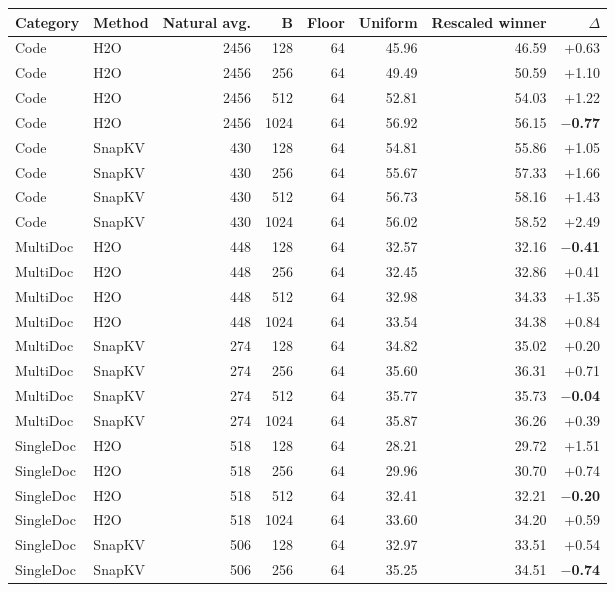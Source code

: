 \begin{table}[t]
  \centering
  \scriptsize
  \setlength{\tabcolsep}{3pt}
  \begin{tabular}{@{}l l r r r r r r@{}}
    \toprule
    Category & Method & Natural avg. & B & Floor & Uniform & Rescaled winner & $\Delta$ \\
    \midrule
    Code & H2O & 2456 & 128 & 64 & 45.96 & 46.59 & +0.63 \\
    Code & H2O & 2456 & 256 & 64 & 49.49 & 50.59 & +1.10 \\
    Code & H2O & 2456 & 512 & 64 & 52.81 & 54.03 & +1.22 \\
    Code & H2O & 2456 & 1024 & 64 & 56.92 & 56.15 & \textbf{$-$0.77} \\
    Code & SnapKV & 430 & 128 & 64 & 54.81 & 55.86 & +1.05 \\
    Code & SnapKV & 430 & 256 & 64 & 55.67 & 57.33 & +1.66 \\
    Code & SnapKV & 430 & 512 & 64 & 56.73 & 58.16 & +1.43 \\
    Code & SnapKV & 430 & 1024 & 64 & 56.02 & 58.52 & +2.49 \\
    MultiDoc & H2O & 448 & 128 & 64 & 32.57 & 32.16 & \textbf{$-$0.41} \\
    MultiDoc & H2O & 448 & 256 & 64 & 32.45 & 32.86 & +0.41 \\
    MultiDoc & H2O & 448 & 512 & 64 & 32.98 & 34.33 & +1.35 \\
    MultiDoc & H2O & 448 & 1024 & 64 & 33.54 & 34.38 & +0.84 \\
    MultiDoc & SnapKV & 274 & 128 & 64 & 34.82 & 35.02 & +0.20 \\
    MultiDoc & SnapKV & 274 & 256 & 64 & 35.60 & 36.31 & +0.71 \\
    MultiDoc & SnapKV & 274 & 512 & 64 & 35.77 & 35.73 & \textbf{$-$0.04} \\
    MultiDoc & SnapKV & 274 & 1024 & 64 & 35.87 & 36.26 & +0.39 \\
    SingleDoc & H2O & 518 & 128 & 64 & 28.21 & 29.72 & +1.51 \\
    SingleDoc & H2O & 518 & 256 & 64 & 29.96 & 30.70 & +0.74 \\
    SingleDoc & H2O & 518 & 512 & 64 & 32.41 & 32.21 & \textbf{$-$0.20} \\
    SingleDoc & H2O & 518 & 1024 & 64 & 33.60 & 34.20 & +0.59 \\
    SingleDoc & SnapKV & 506 & 128 & 64 & 32.97 & 33.51 & +0.54 \\
    SingleDoc & SnapKV & 506 & 256 & 64 & 35.25 & 34.51 & \textbf{$-$0.74} \\

\end{tabular}
\end{table}

